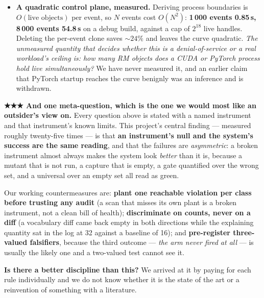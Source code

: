 \documentclass[10.5pt]{article}
\begin{document}
\begin{itemize}[itemsep=0.5ex]
  \measured{} , 2026-08-20 (\S\ref{sec:seqfix}): three sequential guest CUDA
  processes complete with \emph{identical} doorbell counts and 8/8 completions each, host
   0. The fourth reports , \emph{"CUDA unknown error"}. \textbf{Only
  three processes ever existed for four workloads}, so the fourth never reached the device; the
  guest kernel logged nothing while it ran. \textbf{It fails above the  boundary},
  which is precisely where our instruments stop --- our differential covers 
   traffic and nothing else. \emph{What state does  or the guest kernel
  driver keep that is per-boot rather than per-process, and exhausts or wedges after three
  contexts?} ⚠ $n = 1$ boot, and the run's logs are not committed.
\item \textbf{A quadratic control plane, measured.} Deriving process boundaries is
  $O(\text{live objects})$ per event, so $N$ events cost $O(N^2)$: \textbf{1\,000 events 0.85\,s,
  8\,000 events 54.8\,s} on a debug build, against a cap of $2^{18}$ live handles. Deleting the
  per-event clone saves ${\sim}24\%$ and leaves the curve quadratic. \emph{The unmeasured quantity
  that decides whether this is a denial-of-service or a real workload's ceiling is: how many RM
  objects does a CUDA or PyTorch process hold live simultaneously?} We have never measured it, and
  an earlier claim that PyTorch startup reaches the curve benignly was an inference and is
  withdrawn.
\end{itemize}

\begin{warnbox}\small
\textbf{★★★ And one meta-question, which is the one we would most like an outsider's view on.}
Every question above is stated with a named instrument and that instrument's known limits. This
project's central finding — measured roughly twenty-five times — is that \textbf{an instrument's
null and the system's success are the same reading}, and that the failures are
\emph{asymmetric}: a broken instrument almost always makes the system look \emph{better} than it
is, because a mutant that is not run, a capture that is empty, a gate quantified over the wrong
set, and a universal over an empty set all read as green.

\smallskip
Our working countermeasures are: \textbf{plant one reachable violation per class before trusting
any audit} (a scan that misses its own plant is a broken instrument, not a clean bill of health);
\textbf{discriminate on counts, never on a diff} (a vocabulary diff came back empty in both
directions while the explaining quantity sat in the log at 32 against a baseline of 16); and
\textbf{pre-register three-valued falsifiers}, because the third outcome — \emph{the arm never
fired at all} — is usually the likely one and a two-valued test cannot see it.

\smallskip
\textbf{Is there a better discipline than this?} We arrived at it by paying for each rule
individually and we do not know whether it is the state of the art or a reinvention of something
with a literature.
\end{warnbox}
\end{document}
